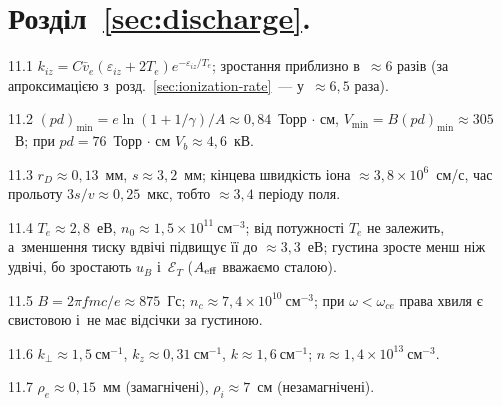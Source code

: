 \protect \section *{Розділ~\ref *{sec:discharge}. }
\begin{Solution}{11.{1}}
		$k_{iz}=C\bar v_e(\varepsilon_{iz}+2T_e)e^{-\varepsilon_{iz}/T_e}$; зростання приблизно в~$\approx6$ разів
	(за апроксимацією з~розд.~\ref{sec:ionization-rate}~--- у~$\approx6{,}5$ раза).
	
\end{Solution}
\begin{Solution}{11.{2}}
		$(pd)_{\min}=e\ln(1+1/\gamma)/A\approx0{,}84$~Торр$\,\cdot\,$см, $V_{\min}=B(pd)_{\min}\approx305$~В;
	при $pd=76$~Торр$\,\cdot\,$см $V_b\approx4{,}6$~кВ.
	
\end{Solution}
\begin{Solution}{11.{3}}
		$r_D\approx0{,}13$~мм, $s\approx3{,}2$~мм; кінцева швидкість іона $\approx3{,}8\times10^6$~см/с,
	час прольоту $3s/v\approx0{,}25$~мкс, тобто $\approx3{,}4$ періоду поля.
	
\end{Solution}
\begin{Solution}{11.{4}}
		$T_e\approx2{,}8$~еВ, $n_0\approx1{,}5\times10^{11}~\mathrm{см}^{-3}$; від потужності
	$T_e$ не залежить, а~зменшення тиску вдвічі підвищує її до $\approx3{,}3$~еВ; густина зросте менш ніж
	удвічі, бо зростають $u_B$ і~$\mathcal E_T$ ($A_{\rm eff}$ вважаємо сталою).
	
\end{Solution}
\begin{Solution}{11.{5}}
		$B=2\pi fmc/e\approx875$~Гс; $n_c\approx7{,}4\times10^{10}~\mathrm{см}^{-3}$; при $\omega<\omega_{ce}$
	права хвиля є свистовою і~не має відсічки за густиною.
	
\end{Solution}
\begin{Solution}{11.{6}}
		$k_\perp\approx1{,}5~\mathrm{см}^{-1}$, $k_z\approx0{,}31~\mathrm{см}^{-1}$, $k\approx1{,}6~\mathrm{см}^{-1}$;
	$n\approx1{,}4\times10^{13}~\mathrm{см}^{-3}$.
	
\end{Solution}
\begin{Solution}{11.{7}}
		$\rho_e\approx0{,}15$~мм (замагнічені), $\rho_i\approx7$~см (незамагнічені).
	
\end{Solution}
